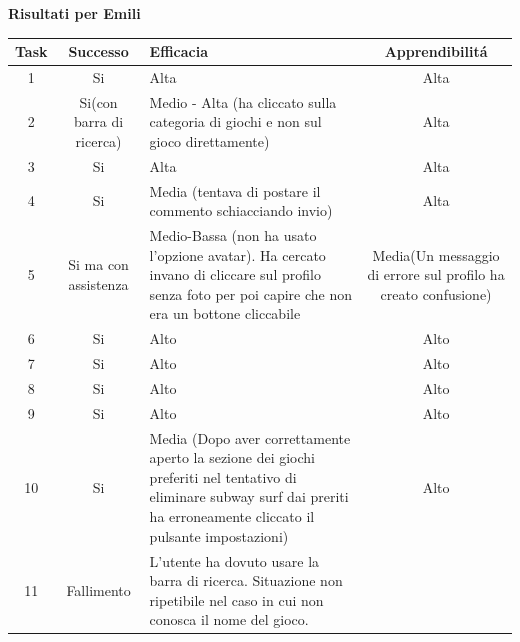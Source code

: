 \documentclass[../Report.tex]{subfiles}
\begin{document}
    \textbf{Risultati per Emili}\\
    \begin{table}[H]
        \begin{tabular}{|c|c|p{5cm}|c|}
            \hline
            Task & Successo & Efficacia & Apprendibilitá \\
            \hline
            1 & Si & Alta & Alta \\
            \hline
            2 & Si(con barra di ricerca) & Medio - Alta (ha cliccato sulla categoria di giochi e non sul gioco direttamente) & Alta \\
            \hline
            3 & Si & Alta & Alta \\
            \hline
            4 & Si & Media (tentava di postare il commento schiacciando invio) & Alta \\
            \hline
            5 & Si ma con assistenza & Medio-Bassa
            (non ha usato l’opzione avatar). Ha cercato invano di cliccare sul profilo senza foto per poi capire che non era un bottone cliccabile & Media(Un messaggio di errore sul profilo ha creato confusione)   \\
            \hline
            6 & Si & Alto & Alto \\
            \hline
            7 & Si & Alto & Alto \\
            \hline
            8 & Si & Alto & Alto \\
            \hline
            9 & Si & Alto & Alto \\
            \hline
            10 & Si & Media (Dopo aver correttamente aperto la sezione dei giochi preferiti nel tentativo di eliminare subway surf dai preriti ha erroneamente cliccato il pulsante impostazioni) & Alto \\
            \hline 
            11 & Fallimento & L’utente ha dovuto usare la barra di ricerca. Situazione non ripetibile nel caso in cui non conosca il nome del gioco. & \\
            \hline
        \end{tabular}
    \end{table}
\end{document}
